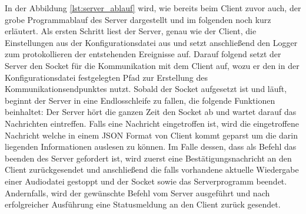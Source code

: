 In der Abbildung \ref{lst:server_ablauf} wird, wie bereits beim Client zuvor
auch, der grobe Programmablauf des Server dargestellt und im folgenden noch
kurz erläutert. Als ersten Schritt liest der Server, genau wie der Client, die
Einstellungen aus der Konfigurationsdatei aus und setzt anschließend den Logger
zum protokollieren der entstehenden Ereignisse auf. Darauf folgend setzt der
Server den Socket für die Kommunikation mit dem Client auf, wozu er den in der
Konfigurationsdatei festgelegten Pfad zur Erstellung des
Kommunikationsendpunktes nutzt. Sobald der Socket aufgesetzt ist und läuft,
beginnt der Server in eine Endlosschleife zu fallen, die folgende Funktionen
beinhaltet: Der Server hört die ganzen Zeit den Socket ab und wartet darauf das
Nachrichten eintreffen. Falls eine Nachricht eingetroffen ist, wird die
eingetroffene Nachricht welche in einem \ac{JSON} Format von Client kommt
geparst um die darin liegenden Informationen auslesen zu können. Im Falle
dessen, dass als Befehl das beenden des Server gefordert ist, wird zuerst eine
Bestätigungsnachricht an den Client zurückgesendet und anschließend die falls
vorhandene aktuelle Wiedergabe einer Audiodatei gestoppt und der Socket sowie
das Serverprogramm beendet. Andernfalls, wird der gewünschte Befehl vom Server
ausgeführt und nach erfolgreicher Ausführung eine Statusmeldung an den Client
zurück gesendet.
	

